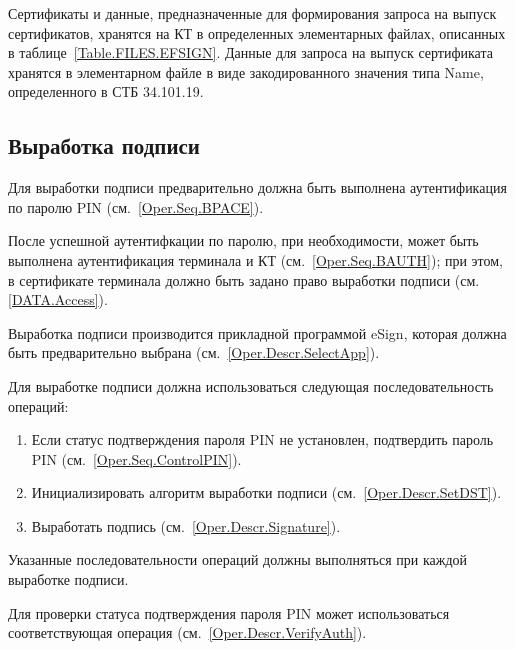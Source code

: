 
Сертификаты и данные, предназначенные для формирования запроса
на выпуск сертификатов, хранятся на КТ в определенных элементарных файлах, 
описанных в таблице~\ref{Table.FILES.EFSIGN}.
Данные для запроса на выпуск сертификата 
хранятся в элементарном файле в виде закодированного
значения типа Name, определенного в СТБ 34.101.19.

\subsection{Выработка подписи}
\label{Oper.Seq.Sig}

Для выработки подписи предварительно 
должна быть выполнена аутентификация по 
паролю PIN  (см.~\ref{Oper.Seq.BPACE}).

После успешной аутентифкации по паролю,
при необходимости, может быть выполнена 
аутентификация терминала и КТ (см.~\ref{Oper.Seq.BAUTH});
при этом, в сертификате терминала должно быть задано право
выработки подписи (см. \ref{DATA.Access}).

Выработка подписи производится прикладной программой eSign, которая
должна быть предварительно выбрана (см.~\ref{Oper.Descr.SelectApp}).

Для выработке подписи  должна использоваться 
следующая последовательность операций:
%
\begin{enumerate}
\item Если статус подтверждения пароля PIN не установлен,
      подтвердить пароль PIN (см.~\ref{Oper.Seq.ControlPIN}).
\item Инициализировать алгоритм выработки подписи (см.~\ref{Oper.Descr.SetDST}).
\item Выработать подпись (см.~\ref{Oper.Descr.Signature}).
\end{enumerate}
%
Указанные последовательности операций должны выполняться
при каждой выработке подписи.

Для проверки статуса подтверждения пароля PIN может использоваться 
соответствующая операция (см.~\ref{Oper.Descr.VerifyAuth}).

